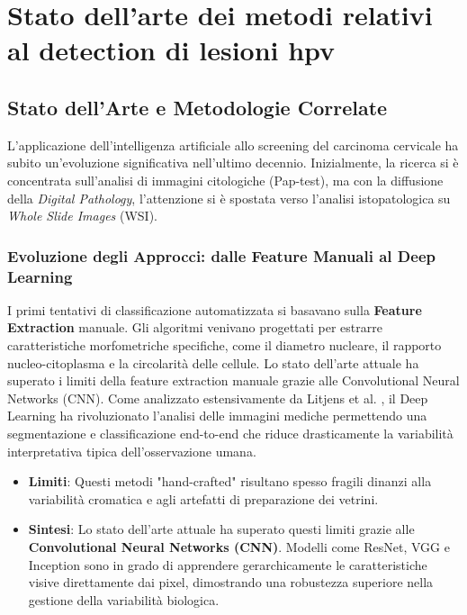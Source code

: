 \chapter[Stato dell'arte: Detection di lesioni HPV]{Stato dell'arte dei metodi relativi al detection di lesioni hpv}

\section{Stato dell'Arte e Metodologie Correlate}
L'applicazione dell'intelligenza artificiale allo screening del carcinoma cervicale ha subito un'evoluzione significativa nell'ultimo decennio. Inizialmente, la ricerca si è concentrata sull'analisi di immagini citologiche (Pap-test), ma con la diffusione della \textit{Digital Pathology}, l'attenzione si è spostata verso l'analisi istopatologica su \textit{Whole Slide Images} (WSI).

\subsection{\small Evoluzione degli Approcci: dalle Feature Manuali al Deep Learning}
I primi tentativi di classificazione automatizzata si basavano sulla \textbf{Feature Extraction} manuale. Gli algoritmi venivano progettati per estrarre caratteristiche morfometriche specifiche, come il diametro nucleare, il rapporto nucleo-citoplasma e la circolarità delle cellule. Lo stato dell'arte attuale ha superato i limiti della feature extraction manuale grazie alle Convolutional Neural Networks (CNN). Come analizzato estensivamente da Litjens et al. \cite{litjens2017survey}, il Deep Learning ha rivoluzionato l'analisi delle immagini mediche permettendo una segmentazione e classificazione end-to-end che riduce drasticamente la variabilità interpretativa tipica dell'osservazione umana. 

\begin{itemize}
	\item \textbf{Limiti}: Questi metodi "hand-crafted" risultano spesso fragili dinanzi alla variabilità cromatica e agli artefatti di preparazione dei vetrini.
	\item \textbf{Sintesi}: Lo stato dell'arte attuale ha superato questi limiti grazie alle \textbf{Convolutional Neural Networks (CNN)}. Modelli come ResNet, VGG e Inception sono in grado di apprendere gerarchicamente le caratteristiche visive direttamente dai pixel, dimostrando una robustezza superiore nella gestione della variabilità biologica.
\end{itemize}



